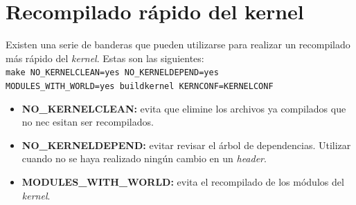 \documentclass[a4paper]{book}
\begin{document}
\section{Recompilado r\'apido del kernel}
Existen una serie de banderas que pueden utilizarse para realizar un recompilado m\'as r\'apido del \emph{kernel}. Estas son las siguientes:\\

\verb|make NO_KERNELCLEAN=yes NO_KERNELDEPEND=yes|\\
\verb|MODULES_WITH_WORLD=yes buildkernel KERNCONF=KERNELCONF|

\begin{itemize}
\item \textbf{NO\_KERNELCLEAN:} evita que elimine los archivos ya compilados que no nec esitan ser recompilados.
\item \textbf{NO\_KERNELDEPEND:} evitar revisar el \'arbol de dependencias. Utilizar cuando no se haya realizado ning\'un cambio en un \emph{header}.
\item \textbf{MODULES\_WITH\_WORLD:} evita el recompilado de los m\'odulos del \emph{kernel}.
\end{itemize}
\end{document}
